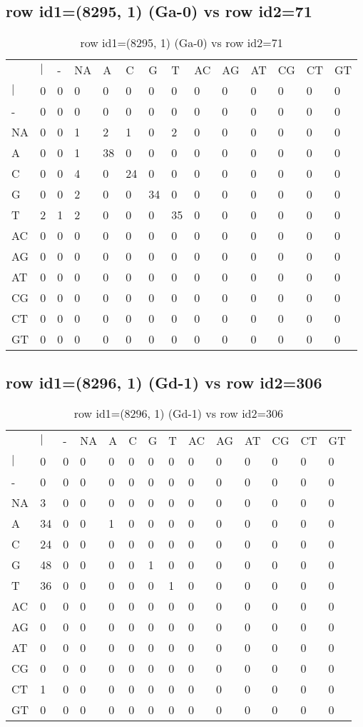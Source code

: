 \subsection{row id1=(8295, 1) (Ga-0) vs row id2=71}
\begin{center}
\begin{longtable}{|l|l|l|l|l|l|l|l|l|l|l|l|l|l|}
\caption{row id1=(8295, 1) (Ga-0) vs row id2=71} \label{table_dm268}\\
\hline
\\
\hline
&$|$&-&NA&A&C&G&T&AC&AG&AT&CG&CT&GT\\
$|$&0&0&0&0&0&0&0&0&0&0&0&0&0\\
-&0&0&0&0&0&0&0&0&0&0&0&0&0\\
NA&0&0&1&2&1&0&2&0&0&0&0&0&0\\
A&0&0&1&38&0&0&0&0&0&0&0&0&0\\
C&0&0&4&0&24&0&0&0&0&0&0&0&0\\
G&0&0&2&0&0&34&0&0&0&0&0&0&0\\
T&2&1&2&0&0&0&35&0&0&0&0&0&0\\
AC&0&0&0&0&0&0&0&0&0&0&0&0&0\\
AG&0&0&0&0&0&0&0&0&0&0&0&0&0\\
AT&0&0&0&0&0&0&0&0&0&0&0&0&0\\
CG&0&0&0&0&0&0&0&0&0&0&0&0&0\\
CT&0&0&0&0&0&0&0&0&0&0&0&0&0\\
GT&0&0&0&0&0&0&0&0&0&0&0&0&0\\
\hline
\end{longtable}
\end{center}

\subsection{row id1=(8296, 1) (Gd-1) vs row id2=306}
\begin{center}
\begin{longtable}{|l|l|l|l|l|l|l|l|l|l|l|l|l|l|}
\caption{row id1=(8296, 1) (Gd-1) vs row id2=306} \label{table_dm270}\\
\hline
\\
\hline
&$|$&-&NA&A&C&G&T&AC&AG&AT&CG&CT&GT\\
$|$&0&0&0&0&0&0&0&0&0&0&0&0&0\\
-&0&0&0&0&0&0&0&0&0&0&0&0&0\\
NA&3&0&0&0&0&0&0&0&0&0&0&0&0\\
A&34&0&0&1&0&0&0&0&0&0&0&0&0\\
C&24&0&0&0&0&0&0&0&0&0&0&0&0\\
G&48&0&0&0&0&1&0&0&0&0&0&0&0\\
T&36&0&0&0&0&0&1&0&0&0&0&0&0\\
AC&0&0&0&0&0&0&0&0&0&0&0&0&0\\
AG&0&0&0&0&0&0&0&0&0&0&0&0&0\\
AT&0&0&0&0&0&0&0&0&0&0&0&0&0\\
CG&0&0&0&0&0&0&0&0&0&0&0&0&0\\
CT&1&0&0&0&0&0&0&0&0&0&0&0&0\\
GT&0&0&0&0&0&0&0&0&0&0&0&0&0\\
\hline
\end{longtable}
\end{center}

